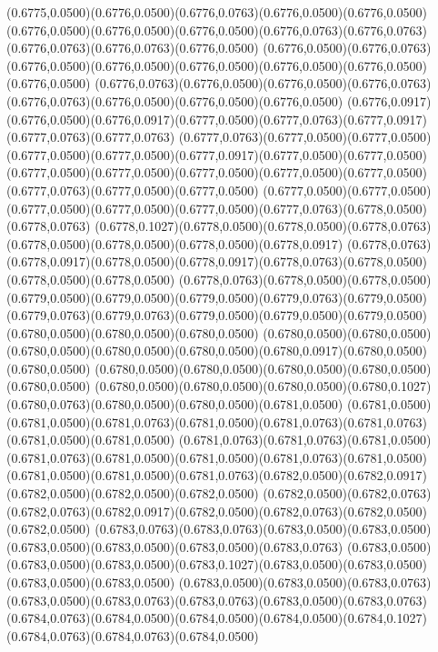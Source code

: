 (0.6775,0.0500)(0.6776,0.0500)(0.6776,0.0763)(0.6776,0.0500)(0.6776,0.0500)
\PST@Solid(0.6776,0.0500)(0.6776,0.0500)(0.6776,0.0500)(0.6776,0.0763)(0.6776,0.0763)(0.6776,0.0763)(0.6776,0.0763)(0.6776,0.0500)
(0.6776,0.0500)(0.6776,0.0763)(0.6776,0.0500)(0.6776,0.0500)(0.6776,0.0500)(0.6776,0.0500)(0.6776,0.0500)(0.6776,0.0500)
(0.6776,0.0763)(0.6776,0.0500)(0.6776,0.0500)(0.6776,0.0763)(0.6776,0.0763)(0.6776,0.0500)(0.6776,0.0500)(0.6776,0.0500)
(0.6776,0.0917)(0.6776,0.0500)(0.6776,0.0917)(0.6777,0.0500)(0.6777,0.0763)(0.6777,0.0917)(0.6777,0.0763)(0.6777,0.0763)
(0.6777,0.0763)(0.6777,0.0500)(0.6777,0.0500)(0.6777,0.0500)(0.6777,0.0500)(0.6777,0.0917)(0.6777,0.0500)(0.6777,0.0500)
(0.6777,0.0500)(0.6777,0.0500)(0.6777,0.0500)(0.6777,0.0500)(0.6777,0.0500)(0.6777,0.0763)(0.6777,0.0500)(0.6777,0.0500)
(0.6777,0.0500)(0.6777,0.0500)(0.6777,0.0500)(0.6777,0.0500)(0.6777,0.0500)(0.6777,0.0763)(0.6778,0.0500)(0.6778,0.0763)
(0.6778,0.1027)(0.6778,0.0500)(0.6778,0.0500)(0.6778,0.0763)(0.6778,0.0500)(0.6778,0.0500)(0.6778,0.0500)(0.6778,0.0917)
(0.6778,0.0763)(0.6778,0.0917)(0.6778,0.0500)(0.6778,0.0917)(0.6778,0.0763)(0.6778,0.0500)(0.6778,0.0500)(0.6778,0.0500)
(0.6778,0.0763)(0.6778,0.0500)(0.6778,0.0500)(0.6779,0.0500)(0.6779,0.0500)(0.6779,0.0500)(0.6779,0.0763)(0.6779,0.0500)
(0.6779,0.0763)(0.6779,0.0763)(0.6779,0.0500)(0.6779,0.0500)(0.6779,0.0500)(0.6780,0.0500)(0.6780,0.0500)(0.6780,0.0500)
(0.6780,0.0500)(0.6780,0.0500)(0.6780,0.0500)(0.6780,0.0500)(0.6780,0.0500)(0.6780,0.0917)(0.6780,0.0500)(0.6780,0.0500)
(0.6780,0.0500)(0.6780,0.0500)(0.6780,0.0500)(0.6780,0.0500)(0.6780,0.0500)
\PST@Solid(0.6780,0.0500)(0.6780,0.0500)(0.6780,0.0500)(0.6780,0.1027)(0.6780,0.0763)(0.6780,0.0500)(0.6780,0.0500)(0.6781,0.0500)
(0.6781,0.0500)(0.6781,0.0500)(0.6781,0.0763)(0.6781,0.0500)(0.6781,0.0763)(0.6781,0.0763)(0.6781,0.0500)(0.6781,0.0500)
(0.6781,0.0763)(0.6781,0.0763)(0.6781,0.0500)(0.6781,0.0763)(0.6781,0.0500)(0.6781,0.0500)(0.6781,0.0763)(0.6781,0.0500)
(0.6781,0.0500)(0.6781,0.0500)(0.6781,0.0763)(0.6782,0.0500)(0.6782,0.0917)(0.6782,0.0500)(0.6782,0.0500)(0.6782,0.0500)
(0.6782,0.0500)(0.6782,0.0763)(0.6782,0.0763)(0.6782,0.0917)(0.6782,0.0500)(0.6782,0.0763)(0.6782,0.0500)(0.6782,0.0500)
(0.6783,0.0763)(0.6783,0.0763)(0.6783,0.0500)(0.6783,0.0500)(0.6783,0.0500)(0.6783,0.0500)(0.6783,0.0500)(0.6783,0.0763)
(0.6783,0.0500)(0.6783,0.0500)(0.6783,0.0500)(0.6783,0.1027)(0.6783,0.0500)(0.6783,0.0500)(0.6783,0.0500)(0.6783,0.0500)
(0.6783,0.0500)(0.6783,0.0500)(0.6783,0.0763)(0.6783,0.0500)(0.6783,0.0763)(0.6783,0.0763)(0.6783,0.0500)(0.6783,0.0763)
(0.6784,0.0763)(0.6784,0.0500)(0.6784,0.0500)(0.6784,0.0500)(0.6784,0.1027)(0.6784,0.0763)(0.6784,0.0763)(0.6784,0.0500)

